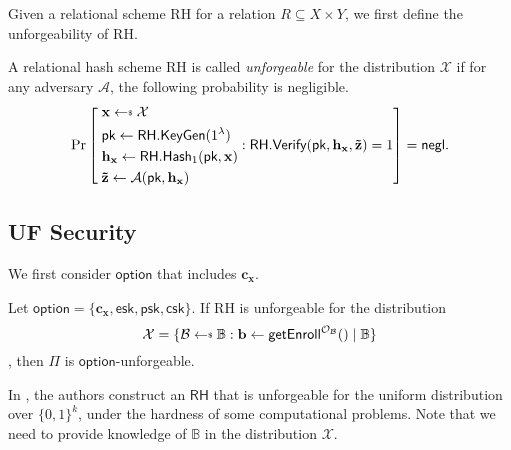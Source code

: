 Given a relational scheme \textsf{RH} for a relation $R \subseteq X \times Y$, we first define the unforgeability \cite{cryptoeprint:2014/394} of \textsf{RH}.

\begin{definition}[Unforgeability]

A relational hash scheme \textsf{RH} is called \emph{unforgeable} for the distribution $\mathcal{X}$ if for any adversary $\mathcal{A}$, the following probability is negligible.
\[
	\Pr \left [
		\begin{aligned} 
			 &\; \mathbf{x} \getsdollar \mathcal{X} \\
			 &\; \textsf{pk} \gets \textsf{RH.KeyGen}(1^\lambda) \\
			 &\; \mathbf{h_x} \gets \textsf{RH.Hash}_1(\textsf{pk}, \mathbf{x}) \\
			 &\; \mathbf{\tilde{z}} \gets \mathcal{A}(\textsf{pk}, \mathbf{h_x})
		\end{aligned} :
		\textsf{RH.Verify}(\textsf{pk}, \mathbf{h_x}, \mathbf{\tilde{z}}) = 1
		\right ] = \negl.
\]

\end{definition}



\subsection{UF Security}
\label{sec:security_analysis:rh:uf}

We first consider $\textsf{option}$ that includes $\mathbf{c_x}$.


\begin{theorem}
\label{thm:rh:uf-uf-cx}

Let $\textsf{option} = \{\mathbf{c_x}, \textsf{esk}, \textsf{psk}, \textsf{csk}\}$. If \textsf{RH} is unforgeable for the distribution
\[
	\mathcal{X} = \{ \mathcal{B} \getsdollar \mathbb{B}: \mathbf{b} \gets {\sf getEnroll}^{\mathcal{O}_\mathcal{B}}() \mid \mathbb{B} \}
\]
, then $\Pi$ is $\textsf{option}$-unforgeable. 

\end{theorem}

In \cite{cryptoeprint:2014/394}, the authors construct an $\textsf{RH}$ that is unforgeable for the uniform distribution over $\{0, 1\}^k$, under the hardness of some computational problems. Note that we need to provide knowledge of $\mathbb{B}$ in the distribution $\mathcal{X}$.

